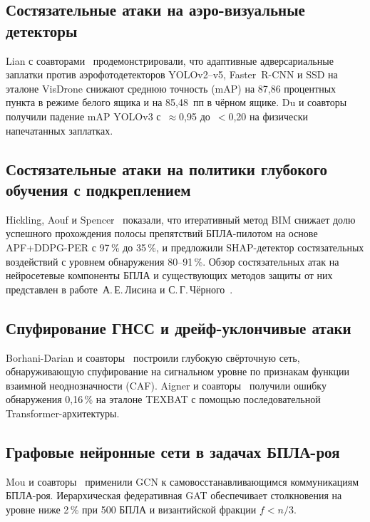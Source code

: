 \subsection{Состязательные атаки на аэро-визуальные детекторы}

Lian с соавторами~\cite{lian_2022_uav} продемонстрировали, что
адаптивные адверсариальные заплатки против аэрофотодетекторов
YOLOv2--v5, Faster~R-CNN и SSD на эталоне VisDrone снижают
среднюю точность (mAP) на 87,86 процентных пункта в режиме белого
ящика и на 85,48~пп в чёрном ящике. Du и соавторы~\cite{du_2022_uav}
получили падение mAP YOLOv3 с~$\approx$0,95 до~$<$0,20 на физически
напечатанных заплатках.

\subsection{Состязательные атаки на политики глубокого обучения с
подкреплением}

Hickling, Aouf и Spencer~\cite{hickling_2023_uav} показали, что
итеративный метод BIM снижает долю успешного прохождения полосы
препятствий БПЛА-пилотом на основе APF+DDPG-PER с 97\,\% до 35\,\%,
и предложили SHAP-детектор состязательных воздействий с уровнем
обнаружения 80--91\,\%. Обзор состязательных атак на нейросетевые
компоненты БПЛА и существующих методов защиты от них представлен в
работе~А.\,Е.\,Лисина и С.\,Г.\,Чёрного~\cite{Lisin2023uav}.

\subsection{Спуфирование ГНСС и дрейф-уклончивые атаки}

Borhani-Darian и соавторы~\cite{borhani_2024_uav} построили глубокую
свёрточную сеть, обнаруживающую спуфирование на сигнальном уровне
по признакам функции взаимной неоднозначности (CAF). Aigner и
соавторы~\cite{aigner_2025_uav} получили ошибку обнаружения 0,16\,\%
на эталоне TEXBAT с помощью последовательной Transformer-архитектуры.

\subsection{Графовые нейронные сети в задачах БПЛА-роя}

Mou и соавторы~\cite{mou_2021_uav} применили GCN к самовосстанавливающимся
коммуникациям БПЛА-роя. Иерархическая федеративная GAT
\cite{hfgat_2025_uav} обеспечивает столкновения на уровне ниже 2\,\% при
500 БПЛА и византийской фракции $f<n/3$.

